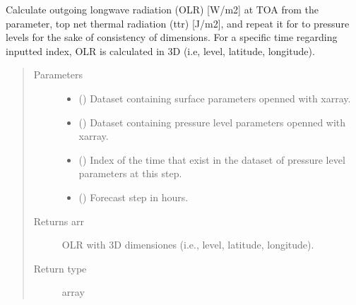 \documentclass[a4paper,11pt,english]{sphinxmanual}
\begin{document}
\begin{fulllineitems}
\label{\detokenize{envlib:envlib.processing_surf_vars.extend_olr_pl_4d}}
\sphinxAtStartPar
Calculate outgoing longwave radiation (OLR) {[}W/m2{]} at TOA from the parameter, top net thermal radiation (ttr)
{[}J/m2{]}, and repeat it for to pressure levels for the sake of consistency of dimensions. For a specific time
regarding inputted index, OLR is calculated in 3D (i.e, level, latitude, longitude).
\begin{quote}\begin{description}
\item[{Parameters}] \leavevmode\begin{itemize}
\item {} 
\sphinxAtStartPar
{} () \textendash{} Dataset containing surface parameters openned with xarray.

\item {} 
\sphinxAtStartPar
{} () \textendash{} Dataset containing pressure level parameters openned with xarray.

\item {} 
\sphinxAtStartPar
{} () \textendash{} Index of the time that exist in the dataset of pressure level parameters at this step.

\item {} 
\sphinxAtStartPar
{} () \textendash{} Forecast step in hours.

\end{itemize}

\item[{Returns arr}] \leavevmode
\sphinxAtStartPar
OLR with 3D dimensiones (i.e., level, latitude, longitude).

\item[{Return type}] \leavevmode
\sphinxAtStartPar
array

\end{description}\end{quote}

\end{fulllineitems}
\end{document}
